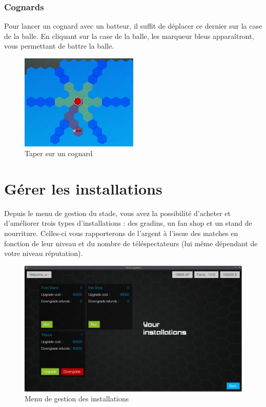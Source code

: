 \subsubsection{Cognards}
Pour lancer un cognard avec un batteur, il suffit de déplacer ce dernier sur la case de la balle. En cliquant sur la case de la balle, les marqueur bleus apparaîtront, vous permettant de battre la balle.

\begin{figure}[h!]
    \centering
    \includegraphics[width=0.5\textwidth]{../screenshots/throw_bludger.png}
    \caption{\label{manual:throw_bludger} Taper sur un cognard}
\end{figure}

\section{Gérer les installations}
Depuis le menu de gestion du stade, vous avez la possibilité d'acheter et d'améliorer trois types 
d'installations : des gradins, un fan shop et un stand de nourriture. Celles-ci vous rapporterons 
de l'argent à l'issue des matches en fonction de leur niveau et du nombre de téléspectateurs (lui
même dépendant de votre niveau réputation).

\begin{figure}[h!]
    \centering
    \includegraphics[width=\textwidth]{../screenshots/installation_manager.png}
    \caption{\label{manual:installation} Menu de gestion des installations}
\end{figure}

